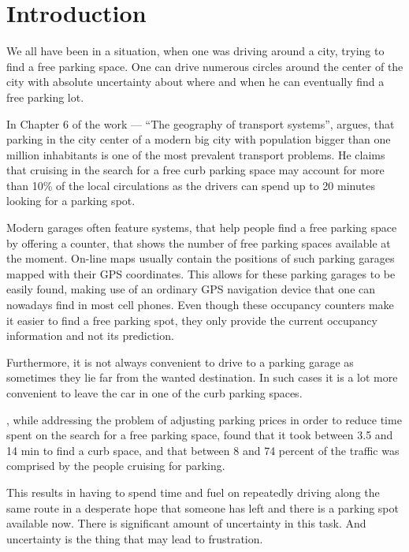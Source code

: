 \chapter{Introduction} %
\label{cha:introduction}

We all have been in a situation, when one was driving around a city,
trying to find a free parking space. One can drive numerous circles around
the center of the city with absolute uncertainty about where and when he
can eventually find a free parking lot.

In Chapter 6 of the work --- ``The geography of transport systems'',
\citet{rodrigue2013geography} argues, that parking in the city center of a
modern big city with population bigger than one million inhabitants is one of
the most prevalent transport problems. He claims that cruising in the search
for a free curb parking space may account for more than 10\% of the local
circulations as the drivers can spend up to 20 minutes looking for a parking
spot.

Modern garages often feature systems, that help people find a free parking
space by offering a counter, that shows the number of free parking spaces
available at the moment. On-line maps usually contain the positions of such
parking garages mapped with their GPS coordinates. This allows for these
parking garages to be easily found, making use of an ordinary GPS navigation
device that one can nowadays find in most cell phones. Even though these
occupancy counters make it easier to find a free parking spot, they only
provide the current occupancy information and not its prediction.

Furthermore, it is not always convenient to drive to a parking garage as
sometimes they lie far from the wanted destination. In such cases it is a lot
more convenient to leave the car in one of the curb parking spaces.

\citet{shoup2006cruising}, while addressing the problem of adjusting parking
prices in order to reduce time spent on the search for a free parking space,
found that it took between 3.5 and 14 min to find a curb space, and that
between 8 and 74 percent of the traffic was comprised by the people cruising
for parking.

This results in having to spend time and fuel on repeatedly driving along the
same route in a desperate hope that someone has left and there is a parking
spot available now. There is significant amount of uncertainty in this task.
And uncertainty is the thing that may lead to frustration.

